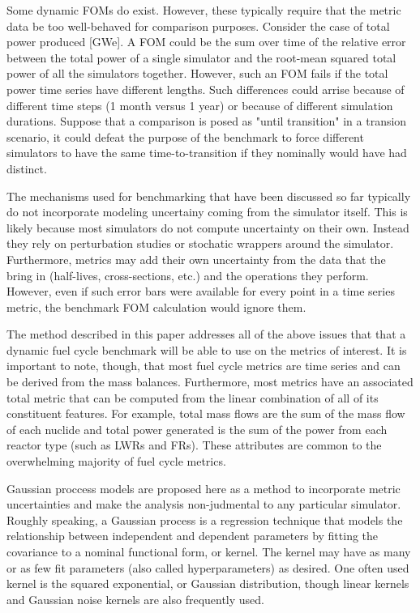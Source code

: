 Some dynamic FOMs do exist. However, these typically require that the metric
data be too well-behaved for comparison purposes. Consider the case of total
power produced [GWe]. A FOM could be the sum over time of the relative error 
between the total power of a single simulator and the root-mean squared total power
of all the simulators together. However, such an FOM fails if the total power
time series have different lengths. Such differences could arrise because 
of different time steps (1 month versus 1 year) or because of different 
simulation durations. Suppose that a comparison is posed as "until transition"
in a transion scenario, it could defeat the purpose of the benchmark to
force different simulators to have the same time-to-transition if they 
nominally would have had distinct. 
 
The mechanisms used for benchmarking that have been discussed so far typically
do not incorporate modeling uncertainy coming from the simulator itself.
This is likely because most simulators do not compute uncertainty on their 
own. Instead they rely on perturbation studies or stochatic wrappers around 
the simulator. Furthermore, metrics may add their own uncertainty from the 
data that the bring in (half-lives, cross-sections, etc.) and the 
operations they perform. However, even if such error bars were available for
every point in a time series metric, the benchmark FOM calculation would 
ignore them.

The method described in this paper addresses all of the above issues that 
that a dynamic fuel cycle benchmark will be able to use on the 
metrics of interest. It is important to note, though, that most fuel cycle 
metrics are time series and can be derived from the mass balances. 
Furthermore, most metrics have an associated total metric that can be 
computed from the linear combination of all of its constituent features. 
For example, total mass flows are the sum of the mass flow of each nuclide
and total power generated is the sum of the power from each reactor type 
(such as LWRs and FRs).  These attributes are common to the overwhelming 
majority of fuel cycle metrics.

Gaussian proccess models are proposed here as a method to incorporate 
metric uncertainties and make the analysis non-judmental to any particular 
simulator. Roughly speaking, a Gaussian process is a regression technique
that models the relationship between independent and dependent parameters
by fitting the covariance to a nominal functional form, or kernel.
The kernel may have as many or as few fit parameters (also called 
hyperparameters) as desired. One often used kernel is the squared 
exponential, or Gaussian distribution, though linear kernels and Gaussian
noise kernels are also frequently used. 

